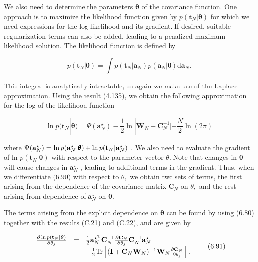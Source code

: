 \documentclass[
  10
]{article}
\begin{document}
We also need to determine the parameters \(\pmb \theta\) of the
covariance function. One approach is to maximize the likelihood function
given by \(p ( \mathbf { t } _ { N } | \pmb { \theta } )\) for which we
need expressions for the log likelihood and its gradient. If desired,
suitable regularization terms can also be added, leading to a penalized
maximum likelihood solution. The likelihood function is defined by

\[
p (\mathbf {t} _ {N} | \boldsymbol {\theta}) = \int p (\mathbf {t} _ {N} | \mathbf {a} _ {N}) p (\mathbf {a} _ {N} | \boldsymbol {\theta}) \mathrm{d} \mathbf {a} _ {N}.\tag{6.89}
\]

This integral is analytically intractable, so again we make use of the
Laplace approximation. Using the result (4.135), we obtain the following
approximation for the log of the likelihood function

\[
\ln p (\mathbf {t} _ {N} | \pmb {\theta}) = \Psi (\mathbf {a} _ {N} ^ {\star}) - \frac {1}{2} \ln | \mathbf {W} _ {N} + \mathbf {C} _ {N} ^ {- 1} | + \frac {N}{2} \ln (2 \pi)\tag{6.90}
\]

where
\(\Psi ( { \bf a } _ { N } ^ { \star } ) = \ln p ( { \bf a } _ { N } ^ { \star } | \pmb { \theta } ) + \ln p ( { \bf t } _ { N } | { \bf a } _ { N } ^ { \star } )\)
. We also need to evaluate the gradient of ln
\(p ( \mathbf { t } _ { N } | \pmb { \theta } )\) with respect to the
parameter vector \(\theta .\) Note that changes in \(\pmb \theta\) will
cause changes in \(\mathbf { a } _ { N } ^ { \star }\) , leading to
additional terms in the gradient. Thus, when we differentiate (6.90)
with respect to \(\theta ,\) we obtain two sets of terms, the first
arising from the dependence of the covariance matrix
\(\mathbf { C } _ { N }\) on \(\theta ,\) and the rest arising from
dependence of \(\mathbf { a } _ { N } ^ { \star }\) on
\(\pmb { \theta } .\)

The terms arising from the explicit dependence on \(\pmb \theta\) can be
found by using (6.80) together with the results (C.21) and (C.22), and
are given by

\[
\begin{array}{r c l} \frac {\partial \ln p (\mathbf {t} _ {N} | \boldsymbol {\theta})}{\partial \theta_ {j}} & = & \frac {1}{2} \mathbf {a} _ {N} ^ {\star^ {\mathrm{T}}} \mathbf {C} _ {N} ^ {- 1} \frac {\partial \mathbf {C} _ {N}}{\partial \theta_ {j}} \mathbf {C} _ {N} ^ {- 1} \mathbf {a} _ {N} ^ {\star} \\ & & - \frac {1}{2} \mathrm{Tr} \left[ (\mathbf {I} + \mathbf {C} _ {N} \mathbf {W} _ {N}) ^ {- 1} \mathbf {W} _ {N} \frac {\partial \mathbf {C} _ {N}}{\partial \theta_ {j}} \right]. \end{array}\tag{6.91}
\]
\end{document}
